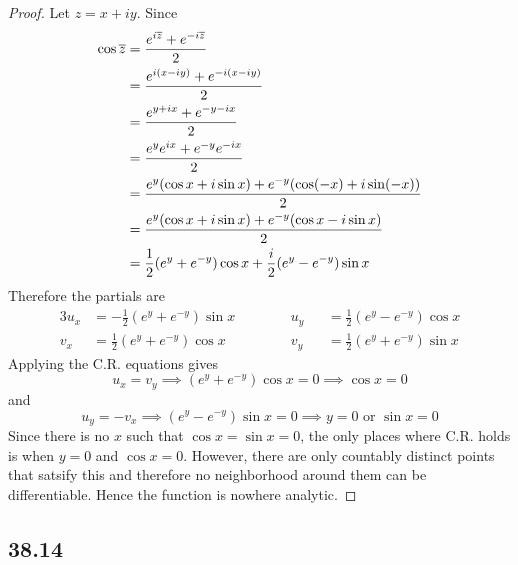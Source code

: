 \documentclass[12pt,titlepage]{extarticle}
\begin{document}
\begin{proof}
    Let $z = x + iy$. Since
    \begin{align*}
        \cos \overline{z} &= \frac{e^{i \overline{z}} + e^{- i \overline{z}}}{2} \\
                      &= \frac{e^{i(x - iy)} + e^{-i(x - iy)}}{2} \\
                      &= \frac{e^{y + ix} + e^{-y - ix}}{2} \\
                      &= \frac{e^{y} e^{ix} + e^{-y} e^{-ix}}{2} \\
                      &= \frac{e^{y} (\cos x + i \sin x) + e^{-y} (\cos(-x) + i \sin(-x))}{2} \\
                      &= \frac{e^{y} (\cos x + i \sin x) + e^{-y} (\cos x - i \sin x)}{2} \\
                      &= \frac{1}{2} (e^y + e^{-y}) \cos x + \frac{i}{2} (e^y - e^{-y}) \sin x
    \end{align*}
    Therefore the partials are
    \begin{alignat*}{3}
        u_x &= -\frac{1}{2} (e^y + e^{-y}) \sin x \hspace{1cm} && u_y &&= \frac{1}{2} (e^y - e^{-y}) \cos x \\
        v_x &= \frac{1}{2} (e^{y} + e^{-y}) \cos x && v_y &&= \frac{1}{2} (e^y + e^{-y}) \sin x
    \end{alignat*}
    Applying the C.R. equations gives
    \[
        u_x = v_y \implies (e^y + e^{-y}) \cos x = 0 \implies \cos x = 0
    \]
    and
    \[
        u_y = -v_x \implies (e^y - e^{-y}) \sin x = 0 \implies y = 0 \text{ or } \sin x = 0
    \]
    Since there is no $x$ such that $\cos x = \sin x = 0$, the only places where C.R. holds is when $y = 0$ and $\cos x = 0$. However, there are only countably distinct points that satsify this and therefore no neighborhood around them can be differentiable. Hence the function is nowhere analytic.
\end{proof}

\subsection*{38.14}
\end{document}
